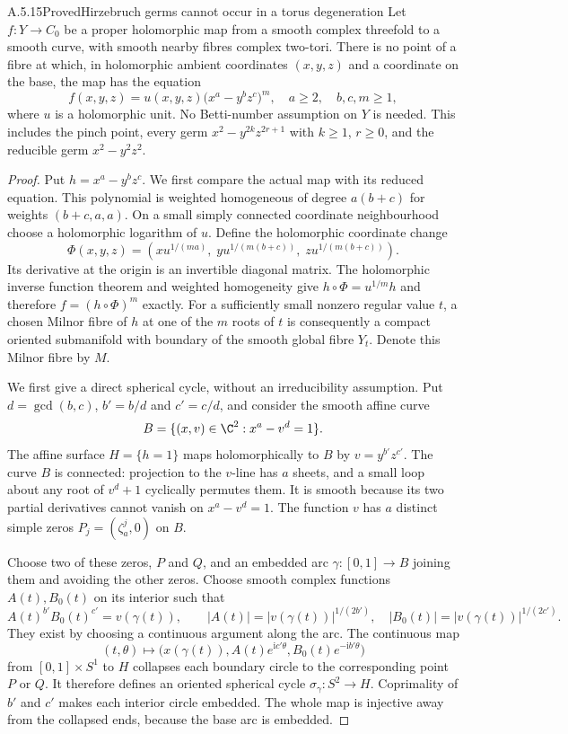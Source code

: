 \begin{statement}{A.5.15}{Proved}{Hirzebruch germs cannot occur in a torus degeneration}
Let $f:Y\to C_0$ be a proper holomorphic map from a
smooth complex threefold to a smooth curve, with smooth
nearby fibres complex two-tori. There is no point of
a fibre at which, in holomorphic ambient coordinates
$(x,y,z)$ and a coordinate on the base, the map has
the equation
\[
 f(x,y,z)=u(x,y,z)\bigl(x^a-y^bz^c\bigr)^m,
 \quad a\ge2,\quad b,c,m\ge1,                                    \tag{A.J.33}
\]
where $u$ is a holomorphic unit. No Betti-number
assumption on $Y$ is needed. This includes the pinch
point, every germ $x^2-y^{2k}z^{2r+1}$ with
$k\ge1$, $r\ge0$, and the reducible germ
$x^2-y^2z^2$.
\end{statement}
\begin{proof}
Put $h=x^a-y^bz^c$. We first compare the actual map
with its reduced equation. This polynomial is weighted
homogeneous of degree $a(b+c)$ for weights
$(b+c,a,a)$. On a small simply connected coordinate
neighbourhood choose a holomorphic logarithm of $u$.
Define the holomorphic coordinate change
\[
 \Phi(x,y,z)=\left(
 x u^{1/(ma)},\;
 y u^{1/(m(b+c))},\;
 z u^{1/(m(b+c))}\right).
                                                        \tag{A.J.34}
\]
Its derivative at the origin is an invertible diagonal
matrix. The holomorphic inverse function theorem and
weighted homogeneity give
$h\circ\Phi=u^{1/m}h$ and therefore
$f=(h\circ\Phi)^m$ exactly. For a sufficiently small
nonzero regular value $t$, a chosen Milnor fibre of
$h$ at one of the $m$ roots of $t$ is consequently a
compact oriented submanifold with boundary of the
smooth global fibre $Y_t$. Denote this Milnor fibre
by $M$.

We first give a direct spherical cycle, without an
irreducibility assumption. Put $d=\gcd(b,c)$,
$b'=b/d$ and $c'=c/d$, and consider the smooth affine
curve
\[
 B=\{(x,v)\in\C^2:x^a-v^d=1\}.
\]
The affine surface $H=\{h=1\}$ maps holomorphically
to $B$ by $v=y^{b'}z^{c'}$. The curve $B$ is
connected: projection to the $v$-line has $a$ sheets,
and a small loop about any root of $v^d+1$ cyclically
permutes them. It is smooth because its two partial
derivatives cannot vanish on $x^a-v^d=1$.
The function $v$ has $a$ distinct simple zeros
$P_j=(\zeta_a^j,0)$ on $B$.

Choose two of these zeros, $P$ and $Q$, and an
embedded arc $\gamma:[0,1]\to B$ joining them and
avoiding the other zeros. Choose smooth complex
functions $A(t),B_0(t)$ on its interior such that
\[
 A(t)^{b'}B_0(t)^{c'}=v(\gamma(t)),\qquad
 |A(t)|=|v(\gamma(t))|^{1/(2b')},\quad
 |B_0(t)|=|v(\gamma(t))|^{1/(2c')}.
\]
They exist by choosing a continuous argument along
the arc. The continuous map
\[
 (t,\theta)\longmapsto
 \bigl(x(\gamma(t)),A(t)e^{\mathrm i c'\theta},
                 B_0(t)e^{-\mathrm i b'\theta}\bigr)
                                                        \tag{A.J.33a}
\]
from $[0,1]\times S^1$ to $H$ collapses each boundary
circle to the corresponding point $P$ or $Q$.
It therefore defines an oriented spherical cycle
$\sigma_\gamma:S^2\to H$. Coprimality of $b'$ and
$c'$ makes each interior circle embedded. The whole
map is injective away from the collapsed ends,
because the base arc is embedded.


\end{proof}
